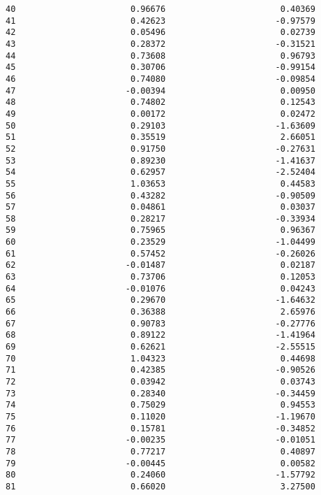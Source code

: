 \documentclass[11pt]{article}
\begin{document}
\begin{tcolorbox}[breakable, size=fbox, boxrule=.5pt, pad at break*=1mm, opacityfill=0]
\begin{Verbatim}[commandchars=\\\{\}]
40                       0.96676                       0.40369
41                       0.42623                      -0.97579
42                       0.05496                       0.02739
43                       0.28372                      -0.31521
44                       0.73608                       0.96793
45                       0.30706                      -0.99154
46                       0.74080                      -0.09854
47                      -0.00394                       0.00950
48                       0.74802                       0.12543
49                       0.00172                       0.02472
50                       0.29103                      -1.63609
51                       0.35519                       2.66051
52                       0.91750                      -0.27631
53                       0.89230                      -1.41637
54                       0.62957                      -2.52404
55                       1.03653                       0.44583
56                       0.43282                      -0.90509
57                       0.04861                       0.03037
58                       0.28217                      -0.33934
59                       0.75965                       0.96367
60                       0.23529                      -1.04499
61                       0.57452                      -0.26026
62                      -0.01487                       0.02187
63                       0.73706                       0.12053
64                      -0.01076                       0.04243
65                       0.29670                      -1.64632
66                       0.36388                       2.65976
67                       0.90783                      -0.27776
68                       0.89122                      -1.41964
69                       0.62621                      -2.55515
70                       1.04323                       0.44698
71                       0.42385                      -0.90526
72                       0.03942                       0.03743
73                       0.28340                      -0.34459
74                       0.75029                       0.94553
75                       0.11020                      -1.19670
76                       0.15781                      -0.34852
77                      -0.00235                      -0.01051
78                       0.77217                       0.40897
79                      -0.00445                       0.00582
80                       0.24060                      -1.57792
81                       0.66020                       3.27500

\end{Verbatim}
\end{tcolorbox}
\end{document}
